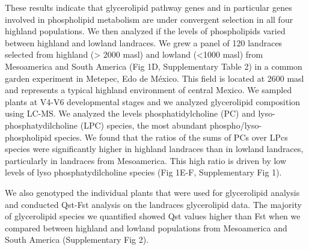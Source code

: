 \documentclass[9pt,twocolumn,twoside,lineno]{gsajnl}
\begin{document}

These results indicate that glycerolipid pathway genes and in particular genes involved in phospholipid metabolism are under convergent selection in all four highland populations. 
We then analyzed if the levels of phospholipids varied between highland and lowland landraces. 
We grew a panel of 120 landraces selected from highland (> 2000 masl) and lowland (<1000 masl) from Mesoamerica and South America (Fig 1D, Supplementary Table 2) in a common garden experiment in Metepec, Edo de México.
This field is located at 2600 masl and represents a typical highland environment of central Mexico. 
We sampled plants at V4-V6 developmental stages and we analyzed glycerolipid composition using LC-MS. We analyzed the levels phosphatidylcholine (PC) and lyso-phosphatydilcholine (LPC) species, the most abundant phospho/lyso-phospholipid species. 
We found that the ratios of the sums of PCs over LPcs species were significantly higher in highland landraces than in lowland landraces, particularly in landraces from Mesoamerica.  
This high ratio is driven by low levels of lyso phosphatydilcholine species (Fig 1E-F, Supplementary Fig 1).

We also genotyped the individual plants that were used for glycerolipid analysis and conducted Qst-Fst analysis on the landraces glycerolipid data. 
The majority of glycerolipid species we quantified showed Qst values higher than Fst when we compared between highland and lowland populations from Mesoamerica and South America (Supplementary Fig 2). 
\end{document}
